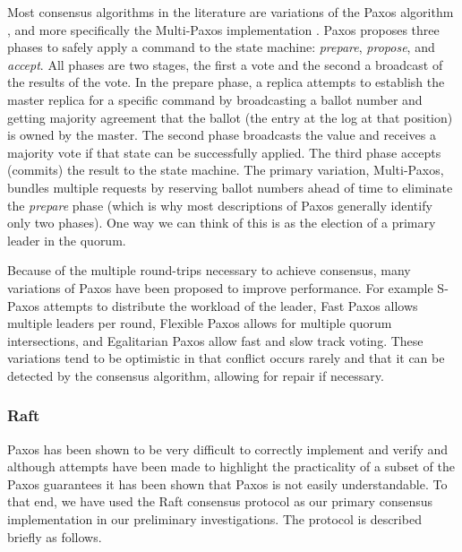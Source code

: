 \documentclass{article}
\begin{document}
Most consensus algorithms in the literature are variations of the Paxos algorithm \cite{paxos,lamport_paxos_2001}, and more specifically the Multi-Paxos implementation \cite{chubby,mazieres_paxos_2007,chandra_paxos_2007}. Paxos proposes three phases to safely apply a command to the state machine: \textit{prepare}, \textit{propose}, and \textit{accept}. All phases are two stages, the first a vote and the second a broadcast of the results of the vote. In the prepare phase, a replica attempts to establish the master replica for a specific command by broadcasting a ballot number and getting majority agreement that the ballot (the entry at the log at that position) is owned by the master. The second phase broadcasts the value and receives a majority vote if that state can be successfully applied. The third phase accepts (commits) the result to the state machine. The primary variation, Multi-Paxos, bundles multiple requests by reserving ballot numbers ahead of time to eliminate the \textit{prepare} phase (which is why most descriptions of Paxos generally identify only two phases). One way we can think of this is as the election of a primary leader in the quorum.

Because of the multiple round-trips necessary to achieve consensus, many variations of Paxos have been proposed to improve performance. For example S-Paxos \cite{biely_s-paxos:_2012} attempts to distribute the workload of the leader, Fast Paxos \cite{lamport_fast_2006} allows multiple leaders per round, Flexible Paxos \cite{2016arXiv160806696H} allows for multiple quorum intersections, and Egalitarian Paxos \cite{moraru_egalitarian_2012,moraru_there_2013} allow fast and slow track voting. These variations tend to be optimistic in that conflict occurs rarely and that it can be detected by the consensus algorithm, allowing for repair if necessary.

\subsubsection{Raft}
\label{sec:raft}

Paxos has been shown to be very difficult to correctly implement and verify \cite{chandra_paxos_2007} and although attempts have been made to highlight the practicality of a subset of the Paxos guarantees \cite{mazieres_paxos_2007} it has been shown that Paxos is not easily understandable. To that end, we have used the Raft consensus protocol \cite{ongaro_search_2014,howard_raft_2015} as our primary consensus implementation in our preliminary investigations. The protocol is described briefly as follows.
\end{document}
